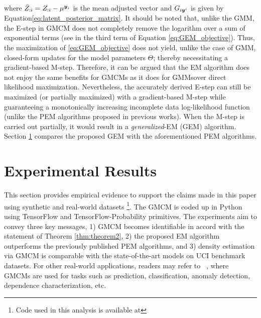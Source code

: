 \documentclass{article}
\theoremstyle{plain}
\theoremstyle{definition}
\theoremstyle{remark}
\begin{document}
where $\bar{Z}_{:{i}}=Z_{:i}-\mu^{\boldsymbol{y}_i}$ is the mean adjusted vector and $G_{i\boldsymbol{y}^i}$ is given by Equation\eqref{eq:latent_posterior_matrix}. It should be noted that, unlike the GMM, the E-step in GMCM does not completely remove the logarithm over a sum of exponential terms (see in the third term of Equation \ref{eq:GEM_objective}). Thus, the maximization of \eqref{eq:GEM_objective} does not yield, unlike the case of GMM, closed-form updates for the model parameters $\Theta$; thereby necessitating a gradient-based M-step. Therefore, it can be argued that the EM algorithm does not enjoy the same benefits for GMCMs \textemdash as it does for GMMs\textemdash over direct likelihood maximization. Nevertheless, the accurately derived E-step can still be maximized (or partially maximized) with a gradient-based M-step while guaranteeing a monotonically increasing incomplete data log-likelihood function (unlike the PEM algorithms proposed in previous works). When the M-step is carried out partially, it would result in a \emph{generalized}-EM (GEM) algorithm. Section \ref{sec:Experimental} compares the proposed GEM with the aforementioned PEM algorithms.

\section{Experimental Results}\label{sec:Experimental}
This section provides empirical evidence to support the claims made in this paper using synthetic and real-world datasets \footnote{Code used in this analysis is available at \color{blue}{https://anonymous.4open.science/r/GMCM-F7CC/README.md}}. The GMCM is coded up in Python using TensorFlow and TensorFlow-Probability primitives.  The experiments aim to convey three key messages, 1) GMCM becomes identifiable in accord with the statement of Theorem \ref{thm:theorem2}, 2) the proposed EM algorithm outperforms the previously published PEM algorithms, and 3) density estimation via GMCM is comparable with the state-of-the-art models on UCI benchmark datasets. For other real-world applications, readers may refer to ~\cite{Bilgrau2012quantification,Wang2014,Yu2013GMCMWindPred,Bayestehtashk2015}, where GMCMs are used for tasks such as prediction, classification, anomaly detection, dependence characterization, etc.
\end{document}
